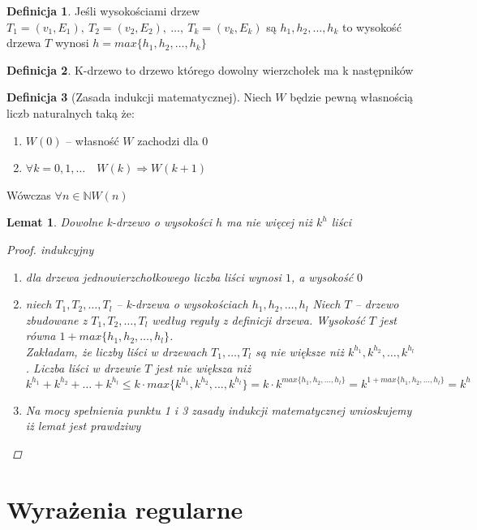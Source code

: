 \documentclass[12pt,a4paper]{article}
\newtheorem{lemat}{Lemat}
\theoremstyle{definition}
\newtheorem{df}{Definicja}
\theoremstyle{remark}
\begin{document}
	\begin{df}
		Jeśli wysokościami drzew $T_1 = (v_1, E_1), ~ T_2 = (v_2, E_2), ~\dots ,~ T_k = (v_k, E_k)$ są $h_1, h_2, \dots , h_k$ to
		wysokość drzewa $T$ wynosi $h = max\{h_1, h_2, \dots , h_k\}$
	\end{df}
	
	\begin{df}
		K-drzewo to drzewo którego dowolny wierzchołek ma k następników
	\end{df}
	
	\begin{df}[Zasada indukcji matematycznej]
		Niech $W$ będzie pewną własnością liczb naturalnych taką że:
		\begin{enumerate}
			\item $W(0)$ -- własność $W$ zachodzi dla $0$
			\item $\forall k=0, 1, \dots \quad W(k) \Rightarrow W(k+1)$ 
		\end{enumerate}
		Wówczas $\forall n \in \mathbb{N} W(n)$
	\end{df}
	
	\begin{lemat}
		Dowolne k-drzewo o wysokości $h$ ma nie więcej niż $k^h$ liści
		\begin{proof} \emph{indukcyjny}\\
			\begin{enumerate}
				\item dla drzewa jednowierzchołkowego liczba liści wynosi $1$, a wysokość $0$
				\item niech $T_1, T_2, \dots, T_l$ -- k-drzewa o wysokościach $h_1, h_2, \dots, h_l$
				Niech $T$ -- drzewo zbudowane z $T_1, T_2, \dots, T_l$ według reguły z definicji drzewa. 
				Wysokość $T$ jest równa $1 + max\{h_1, h_2, \dots, h_l\}$.\\
				Zakładam, że liczby liści w drzewach $T_1, \dots, T_l$ są nie większe niż $k^{h_1}, k^{h_2}, \dots, k^{h_l}$. 
				Liczba liści w drzewie $T$ jest nie większa niż 
				$$k^{h_1} + k^{h_2} + \dots + k^{h_l} \leqslant k\cdot max\{k^{h_1}, k^{h_2}, \dots, k^{h_l}\} = k\cdot k^{max\{h_1, h_2, \dots, h_l\}} 
				= k^{1 + max\{h_1, h_2, \dots, h_l\}} = k^h$$
				\item Na mocy spełnienia punktu 1 i 3 zasady indukcji matematycznej wnioskujemy iż lemat jest prawdziwy
			\end{enumerate}
		\end{proof}
	\end{lemat}
	
\section{Wyrażenia regularne}
	
\end{document}
